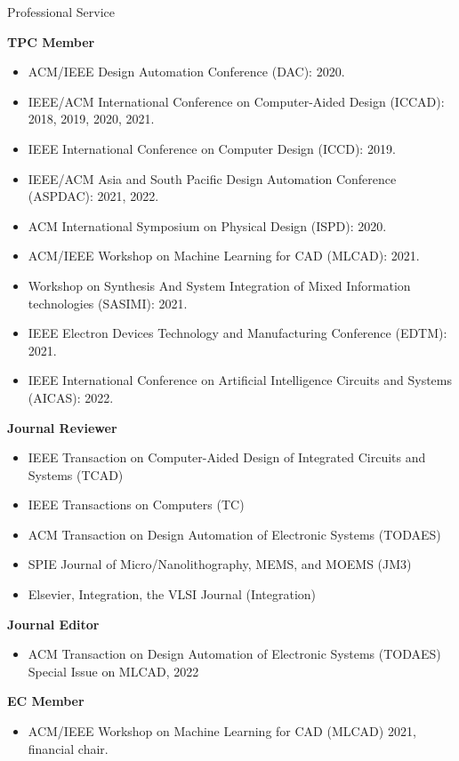 
\begin{rSection}{Professional Service}

\textbf{TPC Member}
\begin{itemize}
    \item ACM/IEEE Design Automation Conference (DAC): 2020.
    \item IEEE/ACM International Conference on Computer-Aided Design (ICCAD): 2018, 2019, 2020, 2021.
    \item IEEE International Conference on Computer Design (ICCD): 2019.
    \item IEEE/ACM Asia and South Pacific Design Automation Conference (ASPDAC): 2021, 2022.
    \item ACM International Symposium on Physical Design (ISPD): 2020.
    \item ACM/IEEE Workshop on Machine Learning for CAD (MLCAD): 2021.
    \item Workshop on Synthesis And System Integration of Mixed Information technologies (SASIMI): 2021.
    \item IEEE Electron Devices Technology and Manufacturing Conference (EDTM): 2021.
    \item IEEE International Conference on Artificial Intelligence Circuits and Systems (AICAS): 2022. 
\end{itemize}

\textbf{Journal Reviewer}
\begin{itemize}
    \item IEEE Transaction on Computer-Aided Design of Integrated Circuits and Systems (TCAD)
    \item IEEE Transactions on Computers (TC)
    \item ACM Transaction on Design Automation of Electronic Systems (TODAES)
    \item SPIE Journal of Micro/Nanolithography, MEMS, and MOEMS (JM3)
    \item Elsevier, Integration, the VLSI Journal (Integration)
\end{itemize}

\textbf{Journal Editor}
\begin{itemize}
    \item ACM Transaction on Design Automation of Electronic Systems (TODAES) Special Issue on MLCAD, 2022
\end{itemize}

\textbf{EC Member}
\begin{itemize}
    \item ACM/IEEE Workshop on Machine Learning for CAD (MLCAD) 2021, financial chair.
\end{itemize}

\end{rSection}
